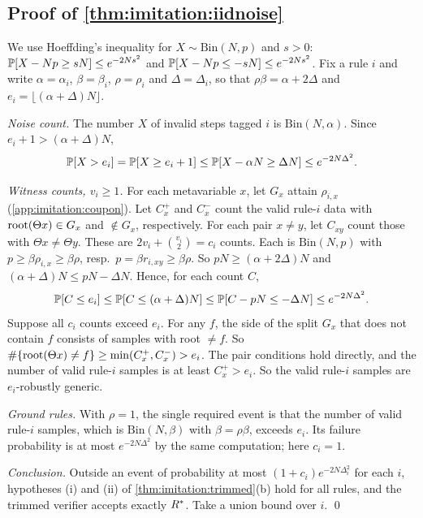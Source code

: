\subsection{Proof of \texorpdfstring{\cref{thm:imitation:iidnoise}}{the i.i.d. noise theorem}}\label{app:imitation:iidnoise}

We use Hoeffding's inequality for $X\sim\mathrm{Bin}(N,p)$ and $s>0$: $\mathbb{P}[X-Np\ge sN]\le e^{-2Ns^2}$ and $\mathbb{P}[X-Np\le-sN]\le e^{-2Ns^2}$. Fix a rule $i$ and write $\alpha=\alpha_i$, $\beta=\beta_i$, $\rho=\rho_i$ and $\Delta=\Delta_i$, so that $\rho\beta=\alpha+2\Delta$ and $e_i=\lfloor(\alpha+\Delta)N\rfloor$.

\emph{Noise count.} The number $X$ of invalid steps tagged $i$ is $\mathrm{Bin}(N,\alpha)$. Since $e_i+1>(\alpha+\Delta)N$,
\[
\mathbb{P}[X>e_i]=\mathbb{P}[X\ge e_i+1]\le\mathbb{P}[X-\alpha N\ge\Delta N]\le e^{-2N\Delta^2}.
\]

\emph{Witness counts, $v_i\ge1$.} For each metavariable $x$, let $G_x$ attain $\rho_{i,x}$ (\cref{app:imitation:coupon}). Let $C_x^{+}$ and $C_x^{-}$ count the valid rule-$i$ data with $\mathrm{root}(\Theta x)\in G_x$ and $\notin G_x$, respectively. For each pair $x\neq y$, let $C_{xy}$ count those with $\Theta x\neq\Theta y$. These are $2v_i+\binom{v_i}2=c_i$ counts. Each is $\mathrm{Bin}(N,p)$ with $p\ge\beta\rho_{i,x}\ge\beta\rho$, resp.\ $p=\beta r_{i,xy}\ge\beta\rho$. So $pN\ge(\alpha+2\Delta)N$ and $(\alpha+\Delta)N\le pN-\Delta N$. Hence, for each count $C$,
\[
\mathbb{P}[C\le e_i]\le\mathbb{P}[C\le(\alpha+\Delta)N]\le\mathbb{P}[C-pN\le-\Delta N]\le e^{-2N\Delta^2}.
\]
Suppose all $c_i$ counts exceed $e_i$. For any $f$, the side of the split $G_x$ that does not contain $f$ consists of samples with root $\neq f$. So $\#\{\mathrm{root}(\Theta x)\neq f\}\ge\min(C_x^+,C_x^-)>e_i$. The pair conditions hold directly, and the number of valid rule-$i$ samples is at least $C^+_x>e_i$. So the valid rule-$i$ samples are $e_i$-robustly generic.

\emph{Ground rules.} With $\rho=1$, the single required event is that the number of valid rule-$i$ samples, which is $\mathrm{Bin}(N,\beta)$ with $\beta=\rho\beta$, exceeds $e_i$. Its failure probability is at most $e^{-2N\Delta^2}$ by the same computation; here $c_i=1$.

\emph{Conclusion.} Outside an event of probability at most $(1+c_i)e^{-2N\Delta_i^2}$ for each $i$, hypotheses (i) and (ii) of \cref{thm:imitation:trimmed}(b) hold for all rules, and the trimmed verifier accepts exactly $R^{*}$. Take a union bound over $i$. \qed

